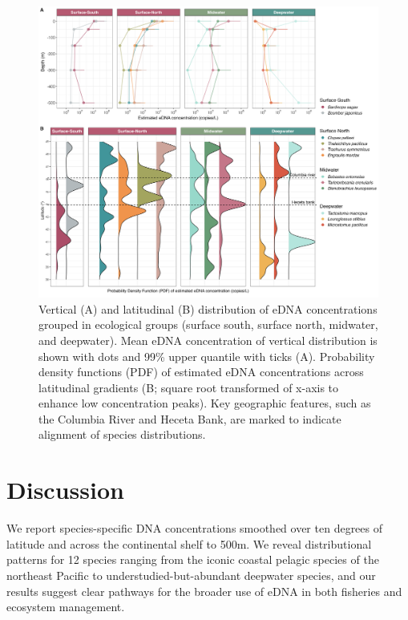 \documentclass{article}
\begin{document}
\begin{figure}[tbhp] 
\centering
\includegraphics[width=16cm]{plots/4_Figure_4.jpg} 
\caption{Vertical (A) and latitudinal (B) distribution of eDNA concentrations grouped in ecological groups (surface south, surface north, midwater, and deepwater). Mean eDNA concentration of vertical distribution is shown with dots and 99\% upper quantile with ticks (A). Probability density functions (PDF) of estimated eDNA concentrations across latitudinal gradients (B; square root transformed of x-axis to enhance low concentration peaks). Key geographic features, such as the Columbia River and Heceta Bank, are marked to indicate alignment of species distributions.}
\label{fig:fig4}
\end{figure}

\section*{Discussion}
We report species-specific DNA concentrations smoothed over ten degrees of latitude and across the continental shelf to 500m. We reveal distributional patterns for 12 species ranging from the iconic coastal pelagic species of the northeast Pacific to understudied-but-abundant deepwater species, and our results suggest clear pathways for the broader use of eDNA in both fisheries and ecosystem management.
\end{document}
